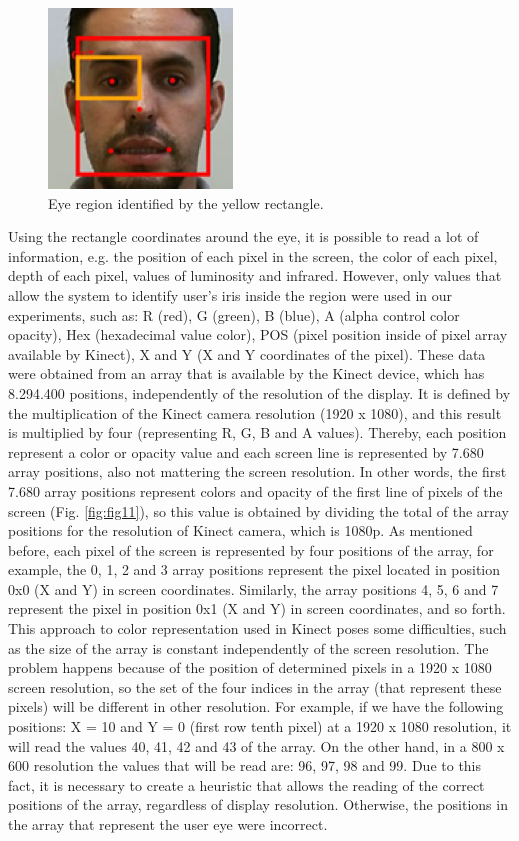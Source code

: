 \documentclass[10pt, conference]{IEEEtran}
\begin{document}
    \begin{figure}[t]
        \centering
        \includegraphics{figures/pic10.png}
        \caption{Eye region identified by the yellow rectangle.}
        \label{fig:fig10}
    \end{figure}

	Using the rectangle coordinates around the eye, it is possible to read a lot of information, e.g. the position of each pixel in the screen, the color of each pixel, depth of each pixel, values of luminosity and infrared. 
	However, only values that allow the system to identify user's iris inside the region were used in our experiments, such as: R (red), G (green), B (blue), A (alpha control color opacity), Hex (hexadecimal value color), POS (pixel position inside of pixel array available by Kinect), X and Y (X and Y coordinates of the pixel).
	These data were obtained from an array that is available by the Kinect device, which has 8.294.400 positions, independently of the resolution of the display. 
	It is defined by the multiplication of the Kinect camera resolution (1920 x 1080), and this result is multiplied by four (representing R, G, B and A values). 
	Thereby, each position represent a color or opacity value and each screen line is represented by 7.680 array positions, also not mattering the screen resolution. 
    In other words, the first 7.680 array positions represent colors and opacity of the first line of pixels of the screen (Fig. \ref{fig:fig11}), so this value is obtained by dividing the total of the array positions for the resolution of Kinect camera, which is 1080p. 
	As mentioned before, each pixel of the screen is represented by four positions of the array, for example, the 0, 1, 2 and 3 array positions represent the pixel located in position 0x0 (X and Y) in screen coordinates. Similarly, the array positions 4, 5, 6 and 7 represent the pixel in position 0x1 (X and Y) in screen coordinates, and so forth.
	This approach to color representation used in Kinect poses some difficulties, such as the size of the array is constant independently of the screen resolution. 
	The problem happens because of the position of determined pixels in a 1920 x 1080 screen resolution, so the set of the four indices in the array (that represent these pixels) will be different in other resolution. 
	For example, if we have the following positions: X = 10 and Y = 0 (first row tenth pixel) at a 1920 x 1080 resolution, it will read the values 40, 41, 42 and 43 of the array. 
    On the other hand, in a 800 x 600 resolution the values that will be read are: 96, 97, 98 and 99. Due to this fact, it is necessary to create a heuristic that allows the reading of the correct positions of the array, regardless of display resolution. Otherwise, the positions in the array that represent the user eye were incorrect. 
\end{document}

